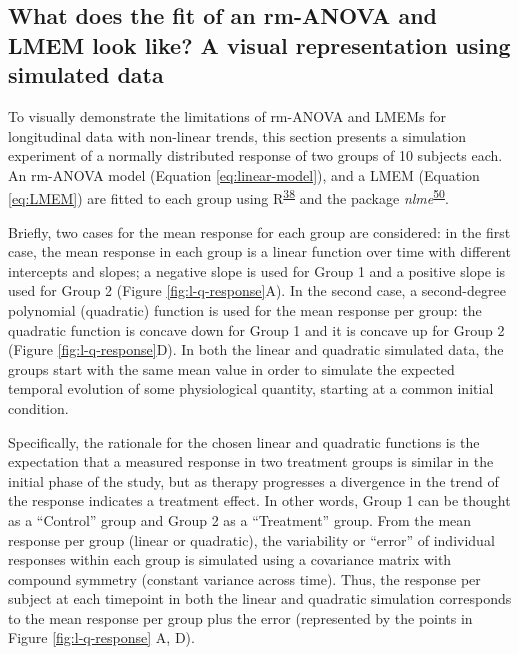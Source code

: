\documentclass[
]{article}
\begin{document}
\hypertarget{simulation}{%
\subsection{What does the fit of an rm-ANOVA and LMEM look like? A visual representation using simulated data}\label{simulation}}

To visually demonstrate the limitations of rm-ANOVA and LMEMs for longitudinal data with non-linear trends, this section presents a simulation experiment of a normally distributed response of two groups of 10 subjects each. An rm-ANOVA model (Equation \eqref{eq:linear-model}), and a LMEM (Equation \eqref{eq:LMEM}) are fitted to each group using R\textsuperscript{\protect\hyperlink{ref-r}{38}} and the package \emph{nlme}\textsuperscript{\protect\hyperlink{ref-nlme}{50}}.

Briefly, two cases for the mean response for each group are considered: in the first case, the mean response in each group is a linear function over time with different intercepts and slopes; a negative slope is used for Group 1 and a positive slope is used for Group 2 (Figure \ref{fig:l-q-response}A). In the second case, a second-degree polynomial (quadratic) function is used for the mean response per group: the quadratic function is concave down for Group 1 and it is concave up for Group 2 (Figure \ref{fig:l-q-response}D). In both the linear and quadratic simulated data, the groups start with the same mean value in order to simulate the expected temporal evolution of some physiological quantity, starting at a common initial condition.

Specifically, the rationale for the chosen linear and quadratic functions is the expectation that a measured response in two treatment groups is similar in the initial phase of the study, but as therapy progresses a divergence in the trend of the response indicates a treatment effect. In other words, Group 1 can be thought as a ``Control'' group and Group 2 as a ``Treatment'' group. From the mean response per group (linear or quadratic), the variability or ``error'' of individual responses within each group is simulated using a covariance matrix with compound symmetry (constant variance across time). Thus, the response per subject at each timepoint in both the linear and quadratic simulation corresponds to the mean response per group plus the error (represented by the points in Figure \ref{fig:l-q-response} A, D).
\end{document}
